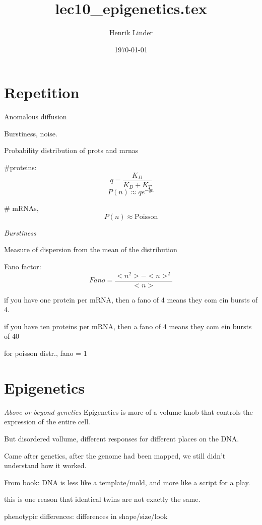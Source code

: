 \documentclass{article}
\title{lec10_epigenetics.tex }
\author{Henrik Linder}
\date{\today}
\begin{document}
\maketitle
\section{Repetition}
Anomalous diffusion

Burstiness, noise. 

Probability distribution of prots and mrnas

\#proteins: 
\begin{equation}
	q = \frac{K_D}{K_D + K_T}
\end{equation}
\begin{equation}
	P(n) \approx q e^{-qn}
\end{equation}

\# mRNAs, 
\begin{equation}
	P(n) \approx \text{Poisson}
\end{equation}

\textit{Burstiness}

Measure of dispersion from the mean of the distribution

Fano factor: 
\begin{equation}
	Fano = \frac{<n^2> - <n>^2}{<n>}
\end{equation}

if you have one protein per mRNA, then a fano of 4 means they com ein bursts of 4. 

if you have ten proteins per mRNA, then a fano of 4 means they com ein bursts of 40

for poisson distr., fano = 1

\section{Epigenetics}
\textit{Above or beyond genetics}
Epigenetics is more of a volume knob that controls the expression of the entire cell. 

But disordered vollume, different responses for different places on the DNA. 

Came after genetics, after the genome had been mapped, we still didn't understand how it worked. 

From book: DNA is less like a template/mold, and more like a script for a play. 

this is one reason that identical twins are not exactly the same. 

phenotypic differences: differences in shape/size/look
\end{document}
